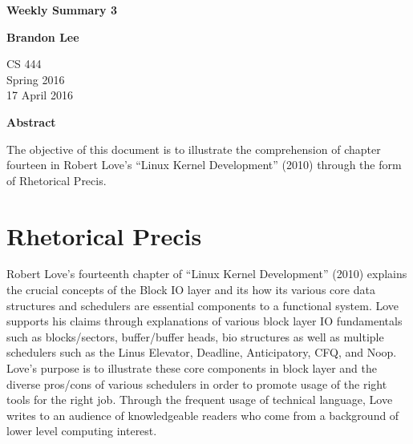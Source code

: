 \documentclass[letterpaper,10pt,titlepage]{article}
\begin{document}
\begin{titlepage}
    \begin{center}
        \vspace*{3.5cm}

        \textbf{Weekly Summary 3}

        \vspace{0.5cm}

        \textbf{Brandon Lee}

        \vspace{0.8cm}

        CS 444\\
        Spring 2016\\
        17 April 2016\\

        \vspace{1cm}

        \textbf{Abstract}\\

        \vspace{0.5cm}

        The objective of this document is to illustrate the comprehension of chapter fourteen in Robert Love's “Linux Kernel Development” (2010) through the form of Rhetorical Precis.

        \vfill



    \end{center}
\end{titlepage}

\newpage

\section{Rhetorical Precis}

Robert Love's fourteenth chapter of “Linux Kernel Development” (2010) explains the crucial concepts of the Block IO layer and its how its various core data structures and schedulers are essential components to a functional system.  Love supports his claims through explanations of various block layer IO fundamentals such as blocks/sectors, buffer/buffer heads, bio structures as well as multiple schedulers such as the Linus Elevator, Deadline, Anticipatory, CFQ, and Noop.  Love's purpose is to illustrate these core components in block layer and the diverse pros/cons of various schedulers in order to promote usage of the right tools for the right job.  Through the frequent usage of technical language, Love writes to an audience of knowledgeable readers who come from a background of lower level computing interest.
\end{document}
